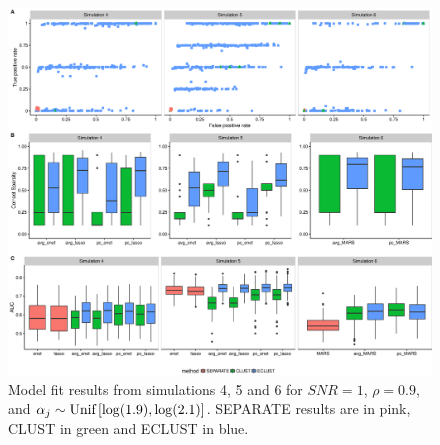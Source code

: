 \begin{figure}[H]
	\centering
	\includegraphics[scale=0.40, keepaspectratio]{./figs/guillimin/results/figures/sim4-5-6-combined/modelfit_sim456.eps}
	\caption{Model fit results from simulations 4, 5 and 6 for $SNR=1$, $\rho = 0.9$, and \mbox{$\alpha_{j} \sim \textrm{{Unif}}\left[\log(1.9), \log(2.1)\right]$}. SEPARATE results are in pink, CLUST in green and ECLUST in blue.}
	\label{fig:sim-modelfit456}
\end{figure}

